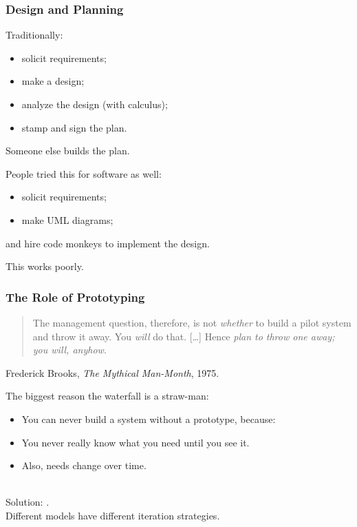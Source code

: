 \begin{frame}
\frametitle{Design and Planning}

\begin{changemargin}{1cm}

Traditionally:

\begin{itemize}
\item solicit requirements;
\item make a design;
\item analyze the design (with calculus);
\item stamp and sign the plan.
\end{itemize}
Someone else builds the plan.

People tried this for software as well:
\begin{itemize}
\item solicit requirements;
\item make UML diagrams; 
\end{itemize}
and hire code monkeys to implement the design.

This works poorly.

\end{changemargin}
\end{frame}

\begin{frame}
\frametitle{The Role of Prototyping}

\begin{changemargin}{1cm}
\begin{quote}
The management question, therefore, is not {\em whether} to build a pilot system and throw it away. You {\em will} do that. [\ldots] Hence {\em plan to throw one away; you will, anyhow}.
\end{quote}
\hfill Frederick Brooks, \emph{The Mythical Man-Month}, 1975.
~

The biggest reason the waterfall is a straw-man: 
\begin{itemize}
\item You can never build a system without a prototype, because:
\item You never really know what you need until you see it.
\item Also, needs change over time.
\end{itemize}
~\\

Solution: .\\Different models have different iteration strategies.

\end{changemargin}
\end{frame}

